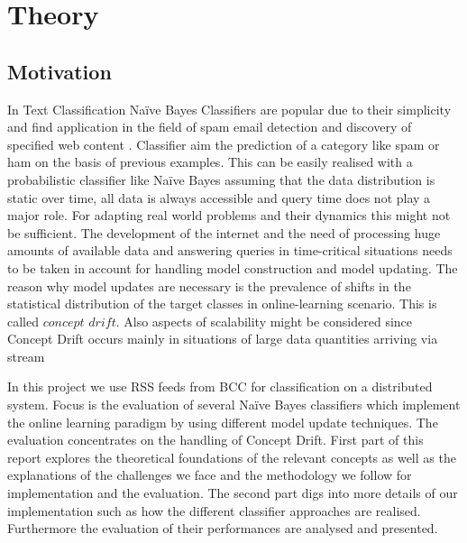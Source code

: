 \documentclass[12pt]{article}
\begin{document}


\renewcommand{\contentsname}{Table of Contents}
\tableofcontents

\newpage



\section{Theory}
\subsection{Motivation}
\begin{spacing}{1.2}
In Text Classification Na\"ive Bayes Classifiers are popular due to their simplicity and find application in the field of spam email detection and discovery of specified web content \citep[p. 225]{ertel2008}. Classifier aim the prediction of a category like spam or ham on the basis of previous examples. This can be easily realised with a probabilistic classifier like Na\"ive Bayes assuming that the data distribution is static over time, all data is always accessible and query time does not play a major role. For adapting real world problems and their dynamics this might not be sufficient. The development of the internet and the need of processing huge amounts of available data and answering queries in time-critical situations needs to be taken in account for handling model construction and model updating. The reason why model updates are necessary is the prevalence of shifts in the statistical distribution of the target classes in online-learning scenario. This is called $concept$ $drift$. Also aspects of scalability might be considered since Concept Drift occurs mainly in situations of large data quantities arriving via stream \citep[p. 4]{tsymbal2004}   

In this project we use RSS feeds from BCC for classification on a distributed system. Focus is the evaluation of several Na\"ive Bayes classifiers which implement the online learning paradigm by using different model update techniques.  The evaluation concentrates on the handling of Concept Drift. First part of this report explores the theoretical foundations of the relevant concepts as well as the explanations of the challenges we face and the methodology we follow for implementation and the evaluation. The second part digs into more details of our implementation such as how the different classifier approaches are realised. Furthermore the evaluation of their performances are analysed and presented.

\end{spacing}
\end{document}
